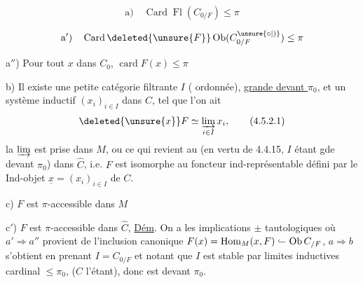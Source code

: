 \[
\text{a)}\quad\operatorname{Card}\operatorname{Fl}(C_{0/F})\leq\pi
\]

\[
\text{a$'$)}\quad\operatorname{Card}\deleted{\unsure{F}}\operatorname{Ob}(C_{0/F}^{\unsure{\circ|)}})\leq\pi
\]

a$''$) Pour tout $x$ dans $C_0$, $\operatorname{card} F(x)\leq\pi$

b) Il existe une petite catégorie filtrante $I$ ( ordonnée), \uline{grande devant $\pi_0$},  et un système inductif $(x_i)_{i\in I}$ dans $C$, tel que l'on ait
\[
\deleted{\unsure{x}}F\simeq\varinjlim_{i\in I}x_i,\tag*{(4.5.2.1)}
\]
 la $\varinjlim$ est prise dans $M$, ou ce qui revient au \unsure{$=$} (en vertu de 4.4.15, $I$ étant gde devant $\pi_0$) dans $\widehat C$, i.e. $F$ est isomorphe au foncteur ind-représentable défini par le Ind-objet $\underline{x}=(x_i)_{i\in I}$ de $C$.

c) $F$ est $\pi$-accessible dans $M$

c$'$) $F$ est $\pi$-accessible dans $\widehat C$,
\uline{Dém}. On a les implications $\pm$ tautologiques
où $a'\Rightarrow a''$ provient de l'inclusion canonique $F(x)=\operatorname{Hom}_M(x,F)\mathrel{\lhook\joinrel\relbar}\operatorname{Ob} C_{/F}$, $a\Rightarrow b$ s'obtient en prenant $I=C_{0/F}$ et notant que $I$ est stable par limites inductives   cardinal $\leq\pi_0$, ($C$ l'étant), donc est  devant $\pi_0$.

